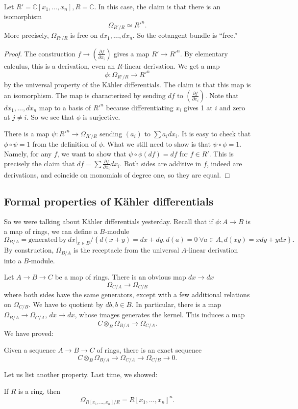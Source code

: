 \begin{example} 
Let $R' = \mathbb{C}[x_1, \dots, x_n], R = \mathbb{C}$. In this case, the claim
is that there is an isomorphism
\[ \Omega_{R'/R} \simeq R'^n.  \]
More precisely, $\Omega_{R'/R}$ is free on $dx_1, \dots,dx_n$. So the cotangent
bundle is ``free.''

\begin{proof} 
The construction $f \to \left( \frac{\partial f}{\partial x_i}  \right)$ gives
a map $R' \to R'^n$. By elementary calculus, this is a derivation, even an
$R$-linear derivation.  We get a map
\[ \phi:\Omega_{R'/R} \to R'^n  \]
by the universal property of the K\"ahler differentials. The claim is that this
map is an isomorphism. The map is characterized by sending $df$ to $\left(
\frac{\partial f}{\partial x_i}\right)$. Note that $dx_1, \dots, dx_n$ map to a
basis of $R'^n$ because differentiating $x_i$ gives 1 at $i$ and zero at $j
\neq i$. So we see that $\phi$ is surjective. 

There is a map $\psi: R'^n \to \Omega_{R'/R}$ sending $\left(a_i  \right)$ to
$\sum a_i dx_i$. It is easy to check that $\phi \circ \psi = 1$ from the
definition of $\phi$. What we still need to show is that $\psi \circ \phi =1$.
Namely, for any $f$, we want to show that $\psi \circ \phi(df) = df$ for $f \in
R'$. This is precisely the claim that $df = \sum \frac{\partial f}{\partial
x_i} dx_i$. Both sides are additive in $f$, indeed are derivations, and
coincide on monomials of degree one, so they are equal.
\end{proof} 

\end{example} 

\subsection{Formal properties of K\"ahler differentials}
So we were talking about K\"ahler differentials yesterday. Recall that if
$\phi: A \to B$ is a map of rings, we can define a $B$-module
\[ \Omega_{B/A} = \mathrm{generated \ by } \ dx|_{x \in
B}/\left\{d(x+y) = dx+dy, d(a)=0 \ \forall a \in A, d(xy) = xdy + ydx\right\}. \]
By construction, $\Omega_{B/A}$ is the receptacle from the universal $A$-linear
derivation into a $B$-module.

Let $A \to B \to C$ be a map of rings. There is an obvious map $dx \to dx$
\[ \Omega_{C/A} \to \Omega_{C/B}  \]
where both sides have the same generators, except with a few additional
relations on $\Omega_{C/B}$. We have to quotient by $db, b \in B$. In
particular, there is a map $\Omega_{B/A} \to \Omega_{C/A}$, $dx \to dx$, whose images
generates the kernel. This induces a map
\[ C \otimes_B \Omega_{B/A} \to \Omega_{C/A}.  \]
We have proved:
\begin{proposition} Given a sequence $A \to B \to C$ of rings, there is an exact sequence 
\[  C \otimes_B \Omega_{B/A} \to \Omega_{C/A} \to \Omega_{C/B} \to 0 .\]
\end{proposition} 
Let us list another property. Last time, we showed:
\begin{proposition} 
If $R$ is a ring, then 
\[ \Omega_{R[x_1, \dots, x_n]/R} = R[x_1, \dots,x_n]^n.  \]
\end{proposition} 

